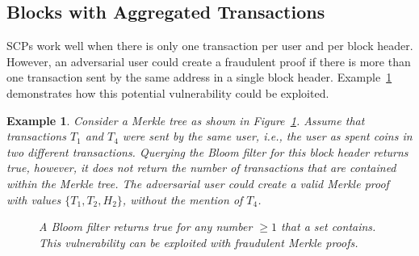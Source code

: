 \documentclass[conference]{IEEEtran}
\newtheorem{example}{Example}[section]
\begin{document}
\subsection{Blocks with Aggregated Transactions}
SCPs work well when there is only one transaction per user and per block header. However, an adversarial user could create a fraudulent proof if there is more than one transaction sent by the same address in a single block header. Example~\ref{ex:FraudMerkleProof} demonstrates how this potential vulnerability could be exploited.

\begin{example}
\label{ex:FraudMerkleProof}
Consider a Merkle tree as shown in Figure~\ref{fig:FraudMerkleProof}. Assume that transactions $T_1$ and $T_4$ were sent by the same user, i.e., the user as spent coins in two different transactions. Querying the Bloom filter for this block header returns \textit{true}, however, it does not return the number of transactions that are contained within the Merkle tree. The adversarial user could create a valid Merkle proof with values $\{T_1, T_2, H_2\}$, without the mention of $T_4$. 
\begin{figure}[hbt]
\centering
{}  
\caption{A Bloom filter returns true for any number $\geq 1$ that a set contains. This vulnerability can be exploited with fraudulent Merkle proofs.\label{fig:FraudMerkleProof}}
\end{figure}
\end{example}
\end{document}
